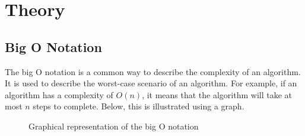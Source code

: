 \chapter{Theory} \label{theory}

\section{Big O Notation} \label{theory:big-o}
The big O notation is a common way to describe the complexity of an algorithm.
It is used to describe the worst-case scenario of an algorithm.
For example, if an algorithm has a complexity of $O(n)$, it means that the algorithm will take at most $n$ steps to complete.
Below, this is illustrated using a graph.
\begin{figure}
    \caption{Graphical representation of the big O notation}
    \label{theory:big-o-graph}
\end{figure}